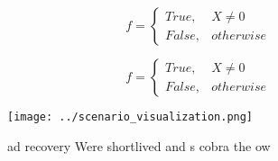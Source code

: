 \documentclass[a4paper]{article}
\begin{document}
\begin{equation}   f =
\begin{cases} True, & X \neq 0\\
False, & otherwise
\end{cases}
\end{equation}

\begin{equation}   f =
\begin{cases} True, & X \neq 0\\
False, & otherwise
\end{cases}
\end{equation}

\begin{figure}
\centering
\texttt{[image: ../scenario\_visualization.png]}
\caption{ ad recovery Were shortlived and s cobra   the ow
}
\end{figure}
 
\end{document}
